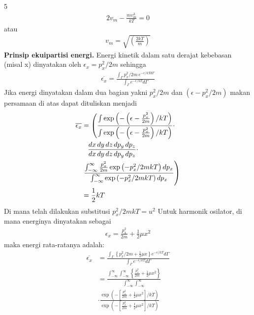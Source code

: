 \documentclass[a4paper  , 6 pt]{article}
\begin{document}
\begin{tiny}
\begin{multicols} {5}
\begin{align}
2  v_m  - \frac{m v_m^3}{kT}  = 0 
\end{align}
atau 
\begin{align}
\boxed{v_m  = \sqrt{\left( \frac{2 kT}{m}\right)}}
\end{align}
\newline
\textbf{Prinsip ekuipartisi energi.} \newline
Energi kinetik dalam satu derajat kebebasan (misal x) dinyatakan oleh $\epsilon_x = p_x^2 /2m $ sehingga 
\begin{align}
\overline{\epsilon_x} = \frac{\int_{\Gamma} p_x^2 /2m \, e^{-\epsilon/kT d \Gamma}}{\int_\Gamma e^{-\epsilon /kT 
} d\Gamma}
\end{align}
Jika energi dinyatakan dalam dua bagian yakni $p_x^2 /2m $ dan $(\epsilon - p_x^2 / 2m)$ makan persamaan di atas dapat dituliskan menjadi
\begin{align}
\overline{ \epsilon_x} & = \left( \frac{\int \exp \left(- \left( \epsilon - \frac{p_x^2}{2m }\right)/kT \right)}{\int \exp \left( - \left( \epsilon - \frac{p_x^2}{2m } \right)/kT\right) } \cdot \right.  \nonumber \\
& \hspace{0.3 cm }  \frac{ dx \, dy \, dz \, dp_y \, dp_z}{dx \, dy \, dz \, dp_y \, dp_z } \cdot \nonumber \\ 
& \hspace{0 cm}
\left.
\frac{\int_{-\infty}^{\infty} \frac{p_x^2}{2m} \exp \left(- p_x^2 /2mkT\right) dp_x }{\int_{-\infty}^{\infty} \exp\left( -p_x^2 /2mkT \right) dp_x } \right) \nonumber \\
& = \frac{1}{2} kT  \nonumber
\end{align}
Di mana telah dilakukan substitusi $p_x^2 / 2mk T  = u^2 $ \newline
Untuk harmonik osilator, di mana energinya dinyatakan sebagai
\begin{align}
\epsilon_x = \frac{p_x^2}{2m } + \frac{1}{2} \mu x^2 
\end{align}
maka energi rata-ratanya adalah:
\begin{align}
\overline{\epsilon_x} & = \frac{\int_\Gamma \left \lbrace p_x^2 /2m + \frac{1}{2} \mu x  \right \rbrace e^{-\epsilon/kT}d \Gamma}{\int_\Gamma e^{- \epsilon /kT} d \Gamma } \nonumber \\
& = \frac{\int_{-\infty}^{\infty} \int_{-\infty}^{\infty}  \left \lbrace   \frac{p_x^2  }{2m} + \frac{1}{2} \mu x^2\right \rbrace }{\int_{-\infty}^{\infty} \int_{-\infty}^{\infty} } \nonumber \\
& \cdot \frac{ \exp \left( - \left[  \frac{p_x^2  }{2m} + \frac{1}{2} \mu x^2 \right ] /kT \right) }{ \exp \left( - \left[  \frac{p_x^2  }{2m} + \frac{1}{2} \mu x^2 \right ] /kT \right) } \nonumber \\

\end{align}
\end{multicols}
\end{tiny}
\end{document}
